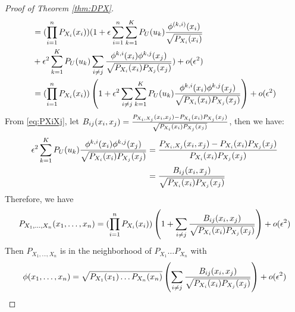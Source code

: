 \begin{proof}[Proof of Theorem \ref{thm:DPX}]
\begin{align*}
&= (\prod_{i=1}^n  P_{X_i} (x_i))
(1+\epsilon\sum_{i=1}^n \sum_{k=1}^{K} P_U(u_k){\phi^{(k,i)}(x_i) \over \sqrt{P_{X_i}(x_i)}} \\
&+\epsilon^2 \sum_{k=1}^{K} P_U(u_k)\sum_{i\neq j}{\phi^{k,i}(x_i)\phi^{k,j}(x_j)\over \sqrt{P_{X_i}(x_i)P_{X_j}(x_j)} } ) + o(\epsilon^2)\\
&= (\prod_{i=1}^n  P_{X_i} (x_i))
\left(1 +\epsilon^2\sum_{i\neq j} \sum_{k=1}^{K}P_U(u_k){\phi^{k,i}(x_i)\phi^{k,j}(x_j)\over \sqrt{P_{X_i}(x_i)P_{X_j}(x_j)} }\right) + o(\epsilon^2)
\end{align*}
From \eqref{eq:PXiXj},
let $B_{ij}(x_i, x_j)={P_{X_i, X_j}(x_i,x_j) - P_{X_i}(x_i)P_{X_j}(x_j) \over \sqrt{P_{X_i}(x_i)P_{X_j}(x_j)}} $, then we have:
\begin{align}
\epsilon^2\sum_{k=1}^{K}P_U(u_k)
{\phi^{k,i}(x_i)\phi^{k,j}(x_j)\over \sqrt{P_{X_i}(x_i)P_{X_j}(x_j)} } & = {P_{X_i, X_j}(x_i, x_j) - P_{X_i}(x_i)P_{X_j}(x_j) \over P_{X_i}(x_i)P_{X_j}(x_j)} \notag\\
& = {B_{ij}(x_i, x_j) \over \sqrt{P_{X_i}(x_i)P_{X_j}(x_j)} } \label{eq:Bsecond}
\end{align}
Therefore, we have 
\begin{equation}\label{eq:sep}
P_{X_1,\dots,X_n}(x_1,\dots,x_n) =  (\prod_{i=1}^n  P_{X_i} (x_i))\left ( 1 + \sum_{i\neq j}{B_{ij}(x_i, x_j) \over \sqrt{P_{X_i}(x_i)P_{X_j}(x_j)} }\right) +o(\epsilon^2)
\end{equation}
Then $P_{X_1,\dots, X_n}$ is in the neighborhood of $P_{X_1}\dots P_{X_n}$ with $$\phi(x_1,\dots, x_n)=
\sqrt{P_{X_1}(x_1)\dots P_{X_n}(x_n)}\left(\sum_{i\neq j}{B_{ij}(x_i, x_j) \over \sqrt{P_{X_i}(x_i)P_{X_j}(x_j)} }\right)+o(\epsilon^2)$$


\end{proof}
